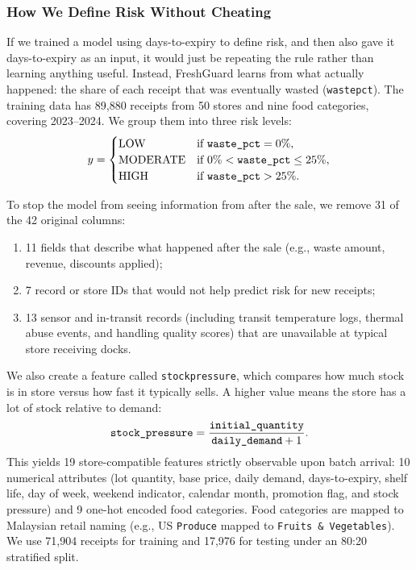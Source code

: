 \documentclass[12pt,a4paper]{article}
\renewcommand{\_}{\oldunderscore\allowbreak}
\begin{document}
\subsubsection{How We Define Risk Without Cheating}
If we trained a model using days-to-expiry to define risk, and then also gave it days-to-expiry as an input, it would just be repeating the rule rather than learning anything useful. Instead, FreshGuard learns from what actually happened: the share of each receipt that was eventually wasted (\texttt{waste\_pct}). The training data has 89,880 receipts from 50 stores and nine food categories, covering 2023--2024. We group them into three risk levels:
\begin{equation}
    y = \begin{cases}
        \text{LOW}      & \text{if } \texttt{waste\_pct} = 0\%, \\
        \text{MODERATE} & \text{if } 0\% < \texttt{waste\_pct} \le 25\%, \\
        \text{HIGH}     & \text{if } \texttt{waste\_pct} > 25\%.
    \end{cases}
\end{equation}

To stop the model from seeing information from after the sale, we remove 31 of the 42 original columns:
\begin{enumerate}[leftmargin=18pt, itemsep=1.5pt]
    \item 11 fields that describe what happened after the sale (e.g., waste amount, revenue, discounts applied);
    \item 7 record or store IDs that would not help predict risk for new receipts;
    \item 13 sensor and in-transit records (including transit temperature logs, thermal abuse events, and handling quality scores) that are unavailable at typical store receiving docks.
\end{enumerate}
We also create a feature called \texttt{stock\_pressure}, which compares how much stock is in store versus how fast it typically sells. A higher value means the store has a lot of stock relative to demand:
\begin{equation}
    \texttt{stock\_pressure} = \frac{\texttt{initial\_quantity}}{\texttt{daily\_demand} + 1}.
\end{equation}
This yields 19 store-compatible features strictly observable upon batch arrival: 10 numerical attributes (lot quantity, base price, daily demand, days-to-expiry, shelf life, day of week, weekend indicator, calendar month, promotion flag, and stock pressure) and 9 one-hot encoded food categories. Food categories are mapped to Malaysian retail naming (e.g., US \texttt{Produce} mapped to \texttt{Fruits \& Vegetables}). We use 71,904 receipts for training and 17,976 for testing under an 80:20 stratified split.
\end{document}
